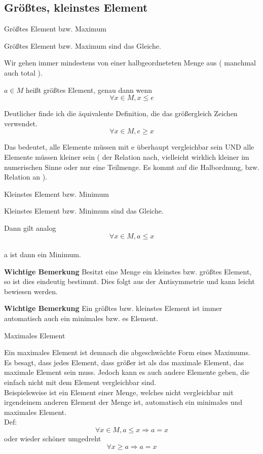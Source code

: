 \documentclass[headsepline,12pt,a4paper]{scrartcl}
\begin{document}
\subsection*{Größtes, kleinstes Element}

\begin{center}
\item[Größtes Element bzw. Maximum]
\end{center}
\item Größtes Element bzw. Maximum sind das Gleiche.
\item Wir gehen immer mindestens von einer halbgeordneteten Menge aus ( manchmal auch total ).
\item $ a\in M$ heißt größtes Element, genau dann wenn $$ \forall x \in M , x \leq e $$
\item Deutlicher finde ich die äquivalente Definition, die das größergleich Zeichen verwendet.
$$ \forall x \in M, e \geq x $$
\item Das bedeutet, alle Elemente müssen mit e überhaupt vergleichbar sein UND alle Elemente müssen kleiner sein ( der Relation nach, vielleicht wirklich kleiner im numerischen Sinne oder nur eine Teilmenge. Es kommt auf die Halbordnung, bzw. Relation an ).


\newpage

\begin{center}
\item[Kleinstes Element bzw. Minimum]
\end{center}
\item Kleinstes Element bzw. Minimum sind das Gleiche.
\item Dann gilt analog $$ \forall x \in M, a \leq x $$ \\
 a ist dann ein Minimum.
\item \textbf{Wichtige Bemerkung} Besitzt eine Menge ein kleinstes bzw. größtes Element, so ist dies eindeutig bestimmt. Dies folgt aus der Antisymmetrie und kann leicht bewiesen werden.
\item \textbf{Wichtige Bemerkung} Ein größtes bzw. kleinstes Element ist immer automatisch auch ein minimales bzw.  es Element.

\newpage

\begin{center}
\item[Maximales Element]
\end{center}
\item Ein maximales Element ist demnach die abgeschwächte Form eines Maximums. Es besagt, dass jedes Element, dass größer ist als das maximale Element, das maximale Element sein muss. Jedoch kann es auch andere Elemente geben, die einfach nicht mit dem Element vergleichbar sind. \\
Beispielsweise ist ein Element einer Menge, welches nicht vergleichbar mit irgendeinem anderen Element der Menge ist, automatisch ein minimales und maximales Element. \\
 Def: $$ \forall x \in M , a \leq x \Rightarrow a = x $$
 oder wieder schöner umgedreht $$ \forall x \geq a \Rightarrow a = x $$
\end{document}
